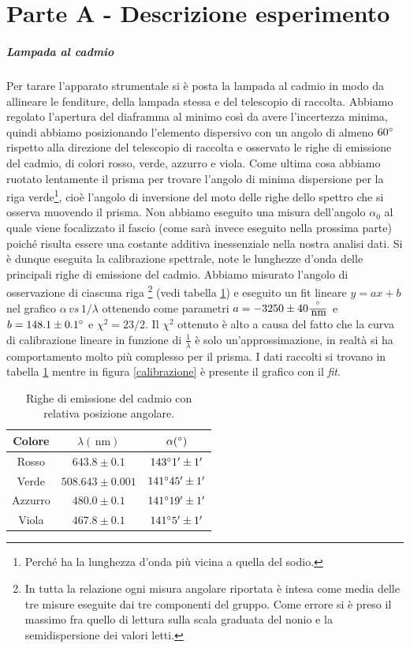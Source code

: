 \documentclass[10pt,a4paper]{article}
\begin{document}
\section{Parte A - Descrizione esperimento}
\subparagraph{Lampada al cadmio}
Per tarare l'apparato strumentale si è posta la lampada al cadmio in modo da allineare le fenditure, della lampada stessa e del telescopio di raccolta. Abbiamo regolato l'apertura del diaframma al minimo così da avere l'incertezza minima, quindi abbiamo posizionando l'elemento dispersivo con un angolo di almeno $60\degree$ rispetto alla direzione del telescopio di raccolta e osservato le righe di emissione del cadmio, di colori rosso, verde, azzurro e viola. Come ultima cosa abbiamo ruotato lentamente il prisma per trovare l'angolo di minima dispersione per la riga verde\footnote{Perché ha la lunghezza d'onda più vicina a quella del sodio.}, cioè l'angolo di inversione del moto delle righe dello spettro che si osserva muovendo il prisma. Non abbiamo eseguito una misura dell'angolo $\alpha_0$ al quale viene focalizzato il fascio (come sarà invece eseguito nella prossima parte) poiché risulta essere una costante additiva inessenziale nella nostra analisi dati.
Si è dunque eseguita la calibrazione spettrale, note le lunghezze d'onda delle principali righe di emissione del cadmio. Abbiamo misurato l'angolo di osservazione di ciascuna riga \footnote{In tutta la relazione ogni misura angolare riportata è intesa come media delle tre misure eseguite dai tre componenti del gruppo. Come errore si è preso il massimo fra quello di lettura sulla scala graduata del nonio e la semidispersione dei valori letti.} (vedi tabella \ref{cadmio}) e eseguito un fit lineare $y=ax+b$ nel grafico $\alpha\, \textit{vs}\, 1/\lambda$ ottenendo come parametri $a = -3250 \pm 40 \frac{\degree}{\,\mbox{nm}}$ e $ b = 148.1 \pm 0.1 \degree$ e $\chi^2=23/2$. Il $\chi^2$ ottenuto è alto a causa del fatto che la curva di calibrazione lineare in funzione di $\frac{1}{\lambda}$ è solo un'approssimazione, in realtà si ha comportamento molto più complesso per il prisma. I dati raccolti si trovano in tabella \ref{cadmio} mentre in figura \ref{calibrazione} è presente il grafico con il \emph{fit}.

\begin{table}[!htb]
\centering
\begin{tabular}{|c|c|c|}
\hline 
Colore & $\lambda (\,\mbox{nm})$ & $\alpha (\degree)$ \\
\hline
Rosso & $643.8\pm0.1$ & $143 \degree 1' \pm 1'$ \\ 
\hline 
Verde & $508.643 \pm 0.001$ & $141 \degree 45' \pm 1'$ \\ 
\hline 
Azzurro & $480.0 \pm 0.1$ & $141 \degree 19' \pm 1'$ \\ 
\hline 
Viola & $467.8 \pm 0.1$	& $141 \degree 5' \pm 1'$ \\ 
\hline 
\end{tabular} 
\caption{Righe di emissione del cadmio con relativa posizione angolare.}\label{cadmio}
\end{table}
\end{document}
